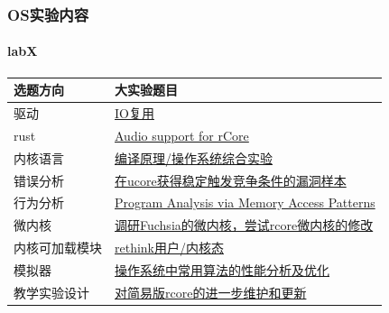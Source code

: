 \documentclass[UTF8]{ctexbeamer}
\begin{document}
\begin{frame}
	\frametitle{OS实验内容}
	\framesubtitle{labX}
	
	\begin{longtable}[]{@{}|l|l|@{}}
		\toprule
		选题方向 & 大实验题目\tabularnewline
		\midrule
		\endhead
		驱动 &
		\href{http://os.cs.tsinghua.edu.cn/oscourse/OsTrain2019/g4}{IO复用}\tabularnewline \hline
		rust &
		\href{http://os.cs.tsinghua.edu.cn/oscourse/OS2019spring/projects/g08}{Audio
			support for rCore}\tabularnewline \hline
		内核语言 &
		\href{http://os.cs.tsinghua.edu.cn/oscourse/OsTrain2019/g6}{编译原理/操作系统综合实验}\tabularnewline \hline
		错误分析 &
		\href{http://os.cs.tsinghua.edu.cn/oscourse/OS2019spring/projects/g07}{在ucore获得稳定触发竞争条件的漏洞样本}\tabularnewline \hline
		行为分析 &
		\href{http://os.cs.tsinghua.edu.cn/oscourse/OS2019spring/projects/g09}{Program
			Analysis via Memory Access Patterns}\tabularnewline \hline
		微内核 &
		\href{http://os.cs.tsinghua.edu.cn/oscourse/OsTrain2019/g1}{调研Fuchsia的微内核，尝试rcore微内核的修改}\tabularnewline \hline
		内核可加载模块 &
		\href{http://os.cs.tsinghua.edu.cn/oscourse/OsTrain2019/g5}{rethink用户/内核态}\tabularnewline \hline
		模拟器 &
		\href{http://os.cs.tsinghua.edu.cn/oscourse/OS2019spring/projects/g10}{操作系统中常用算法的性能分析及优化}\tabularnewline \hline
		教学实验设计 &
		\href{http://os.cs.tsinghua.edu.cn/oscourse/OsTrain2019/g7}{对简易版rcore的进一步维护和更新}\tabularnewline \hline
		\bottomrule
	\end{longtable}
	
	
\end{frame}
\end{document}
